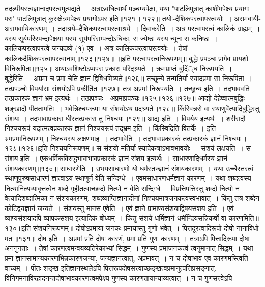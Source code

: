 तदल्पीयस्त्वज्ञानादपरत्वमुत्पद्यते~। अत्राऽवधित्वार्थं पञ्चम्यपेक्षा, यथा "पाटलिपुत्रात् काशीमपेक्ष्य प्रयागः परः" पाटलिपुत्रात् कुरुक्षेत्रमपेक्ष्य प्रयागोऽपर इति॥१२१॥
१२२॥
तयोः-दैशिकपरत्वापरत्वयोः~। असमवायी-असमवायिकारणम्~। तदाश्रये--दैशिकपरत्वापरत्वाश्रये~। दिवाकरेति~। अत्र परत्वापरत्वं कालिकं ग्राह्यम्~। यस्य सूर्यपरिस्पन्दापेक्षया
यस्य सूर्यपरिसम्पन्दोऽधिकः, स ज्येष्ठः यस्य न्यूनः स कनिष्ठः~। कालिकपरत्वापरत्वे जन्यद्रव्ये (१) एव~। अत्र-कालिकपरत्वापरत्वयोः~। तेषां-
कालिकदैशिकपरत्वापरत्वानाम्॥१२३॥१२४॥
॥इति परत्वापरत्वनिरूपणम्॥
बुद्धेः प्रपञ्चः प्रागेव प्रायशो विनिरूपितः॥१२५॥
अथाऽवशिष्टोऽप्यपरः प्रकारः परिदश्र्यते~।
क्रमप्राप्तं बुदिं्ध निरूपयति~। बुद्धेरिति~।
अप्रमा च प्रमा चेति ज्ञानं द्विविधमिष्यते॥१२६॥
तच्छून्ये तन्मतिर्या स्यादप्रमा सा निरूपिता~।
तत्प्रपञ्चो विपर्यासः संशयोऽपि प्रकीर्तितः॥१२७॥
तत्र अप्रमां निरूपयति~। तच्छून्य इति~। तदभाववति तत्प्रकारकं ज्ञानं भ्रम इत्यर्थः~। तत्प्रपञ्चः - अप्रमाप्रपञ्चः॥१२५॥१२६॥१२७॥
आद्यो देहेष्वात्मबुद्धिः शङ्खादौ पीततामतिः~।
भवेन्निश्चयरूपा या संशयोऽथ प्रदश्र्यते॥१२८॥
किंस्विन्नरो वा स्थाणुर्वेत्यादिबुद्धिस्तु संशयः~।
तदभावाप्रकारा धीस्तत्प्रकारा तु निश्चयः॥१२९॥
आद्य इति~। विपर्यय इत्यर्थः~। शरीरादौ निश्चयरूपं यदात्मत्वप्रकारकं ज्ञानं निश्चयरूपं तद्भ्रम इति~। किंस्विदिति वितर्के~। इति भ्रमप्रमानिरूपणम्॥
निश्चयस्य लक्षणमाह~। तदभावेति~। तदभावाप्रकारकं तत्प्रकारकं ज्ञानं निश्चयः॥१२८॥१२६॥इति निश्चयनिरूपणम्॥
स संशयो मतिर्या स्यादेकत्राऽभावभावयोः~।
संशयं लक्षयति~। स संशय इति~। एकधर्मिकविरुद्धभावाभावप्रकारकं ज्ञानं संशय इत्यर्थः~।
साधारणादिधर्मस्य ज्ञानं संशयकारणम्॥१३०॥
साधारणेति~। उभयसाधारणो यो धर्मस्तज्ज्ञानं संशयकारणम्~। यथा उच्चैस्तरत्वं स्थाणुपुरुषसाधारणं ज्ञात्वाऽयं स्थाणुर्न वेति सन्दिग्धे~। एवमसाधारणधर्मज्ञानं
कारणम्~। यथा शब्दत्वस्य नित्यानित्यव्यावृत्तत्वेन शब्दे गृहीतत्वाच्छब्दो नित्यो न वेति सन्दिग्धे~। विप्रत्तिपत्तिस्तु शब्दो नित्यो न वेत्यादिशब्दात्मिका न संशयकारणम्,
शब्दव्याप्तिज्ञानादीनां निश्चयमात्रजनकत्वस्वभावात्~। किंतु तत्र शब्देन कोटिद्वयज्ञानं जन्यते~। संशयस्तु मानस एवेति~। एवं ज्ञाने प्रामाण्यसंशयाद्विषयसंशय इति~। एवं
व्याप्यसंशयादपि व्यापकसंशय इत्यादिकं बोध्यम्~। किंतु संशये धर्मिज्ञानं धर्मीन्द्रियसन्निकर्षो वा कारणमिति॥१३०॥इति संशयनिरूपणम्॥
दोषोऽप्रमाया जनकः प्रमायास्तु गुणो भवेत्~।
पित्तदूरत्वादिरूपो दोषो नानाविधो मतः॥१३१॥
दोष इति~। अप्रमां प्रति दोषः कारणं, प्रमां प्रति गुणः कारणम्~। तत्राऽपि पित्तादिरूपा दोषा अननुगताः~। तेषां कारणत्वमन्वयव्यतिरेकाभ्यां सिद्धम्~। गुणस्य
प्रमाजनकत्वं त्वनुमानात् सिद्धम्~। यथा प्रमा ज्ञानसामान्यकारणभिन्नकारणजन्या, जन्यज्ञानत्वात्, अप्रमावत्~। न च दोषाभाव एव कारणमस्त्विति वाच्यम्~। पीतः शङ्ख
इतिज्ञानस्थलेऽपि पित्तरूपदोषसत्त्वाच्छङ्खत्वप्रमानुत्पत्तिप्रसङ्गात्, विनिगमनाविरहादनन्तदोषाभावकारणत्वमपेक्ष्य गुणस्य कारणतायान्याय्यत्वात्~। न च गुणसत्त्वेऽपि
